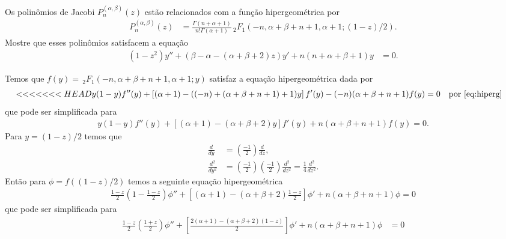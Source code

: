 \documentclass[a4paper,12pt, leqno, answers]{exam}
\begin{document}
\begin{questions}
     Os polin\^{o}mios de Jacobi $P_n^{(\alpha, \beta)}(z)$ est\~{a}o relacionados com a fun\c{c}\~{a}o hipergeom\'{e}trica por
    \begin{align*}
        P_n^{(\alpha, \beta)}(z) &= \frac{\Gamma(n + \alpha + 1)}{n! \Gamma(\alpha + 1)} \,_2F_1(-n, \alpha + \beta + n + 1, \alpha + 1; (1 - z) / 2).
    \end{align*}
    Mostre que esses polinômios satisfacem a equa\c{c}\~{a}o
    \begin{align*}
        (1 - z^2) y'' + (\beta - \alpha - (\alpha + \beta + 2)z)y' + n(n + \alpha + \beta + 1)y &= 0.
    \end{align*}
    \begin{solution}
        Temos que $f(y) = \,_2F_1(-n, \alpha + \beta + n + 1, \alpha + 1; y)$ satisfaz a equa\c{c}\~{a}o hipergeom\'{e}trica dada por
        \begin{align*}
<<<<<<< HEAD
            y (1 - y) f''(y) + \left[ (\alpha + 1) - ( (-n) + (\alpha + \beta + n + 1) + 1)y \right] f'(y) - (-n) (\alpha + \beta + n + 1) f(y) &= 0 && \text{por \eqref{eq:hiperg}}
        \end{align*}
        que pode ser simplificada para
        \begin{align*}
            y (1 - y) f''(y) + \left[ (\alpha + 1) - (\alpha + \beta + 2)y \right] f'(y) + n (\alpha + \beta + n + 1) f(y) = 0.
        \end{align*}
        Para $y = (1 - z)/2$ temos que
        \begin{align}
            \frac{d}{dy} &= \left( \frac{-1}{2} \right) \frac{d}{dz}, \\
            \frac{d^2}{dy^2} &= \left( \frac{-1}{2} \right) \left( \frac{-1}{2} \right) \frac{d^2}{dz^2} = \frac{1}{4} \frac{d^2}{dz^2}.
        \end{align}
        Ent\~{a}o para $\phi = f( (1 - z)/2 )$ temos a seguinte equa\c{c}\~{a}o hipergeom\'{e}trica
        \begin{align*}
            \frac{1 - z}{2} \left( 1 - \frac{1 - z}{2} \right) \phi'' + \left[ (\alpha + 1) - (\alpha + \beta + 2) \frac{1 - z}{2} \right] \phi' + n (\alpha + \beta + n + 1) \phi = 0
        \end{align*}
        que pode ser simplificada para
        \begin{align*}
            \frac{1 - z}{2} \left( \frac{1 + z}{2} \right) \phi'' + \left[ \frac{2(\alpha + 1) - (\alpha + \beta + 2) (1 - z)}{2} \right] \phi' + n (\alpha + \beta + n + 1) \phi &= 0 \\

\end{align*}
\end{solution}
\end{questions}
\end{document}
